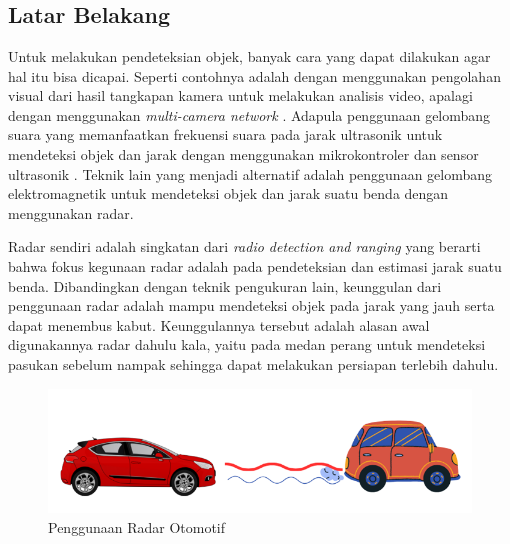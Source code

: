 \chapter{\babSatu}
\section{Latar Belakang}
Untuk melakukan pendeteksian objek, banyak cara yang dapat dilakukan agar hal itu bisa dicapai. Seperti contohnya adalah dengan menggunakan pengolahan visual dari hasil tangkapan kamera untuk melakukan analisis video, apalagi dengan menggunakan \textit{multi-camera network} \cite{Zhang2015}. Adapula penggunaan gelombang suara yang memanfaatkan frekuensi suara pada jarak ultrasonik untuk mendeteksi objek dan jarak dengan menggunakan mikrokontroler dan sensor ultrasonik \cite{Biswas2020}. Teknik lain yang menjadi alternatif adalah penggunaan gelombang elektromagnetik untuk mendeteksi objek dan jarak suatu benda dengan menggunakan radar. 

Radar sendiri adalah singkatan dari \textit{radio detection and ranging} yang berarti bahwa fokus kegunaan radar adalah pada pendeteksian dan estimasi jarak suatu benda. Dibandingkan dengan teknik pengukuran lain, keunggulan dari penggunaan radar adalah mampu mendeteksi objek pada jarak yang jauh serta dapat menembus kabut. Keunggulannya tersebut adalah alasan awal digunakannya radar dahulu kala, yaitu  pada medan perang untuk mendeteksi pasukan sebelum nampak sehingga dapat melakukan persiapan terlebih dahulu. 

\begin{figure}
	\begin{center}
		\includegraphics[scale=0.5]{pics/bab1/AplikasiRadar.png} 
		\caption[Penggunaan Radar Otomotif]{Penggunaan Radar Otomotif}
		\label{pic:aplikasiRadarKini}
	\end{center}
\end{figure}

